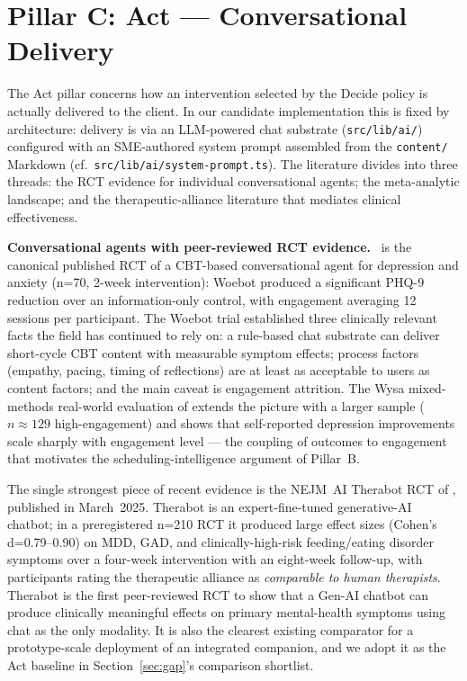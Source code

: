 \documentclass[10pt,conference]{article}
\newcommand{\secref}[1]{Section~\ref{#1}}
\renewcommand{\paragraph}[1]{\smallskip\par\noindent\textbf{#1}~\ignorespaces}
\begin{document}
\section{Pillar C: Act --- Conversational Delivery}\label{sec:act}

The Act pillar concerns how an intervention selected by the Decide
policy is actually delivered to the client. In our candidate
implementation this is fixed by architecture: delivery is via an
LLM-powered chat substrate (\texttt{src/lib/ai/}) configured with an
SME-authored system prompt assembled from the \texttt{content/}
Markdown (cf.\ \texttt{src/lib/ai/system-prompt.ts}). The literature
divides into three threads: the RCT evidence for individual
conversational agents; the meta-analytic landscape; and the
therapeutic-alliance literature that mediates clinical effectiveness.

\paragraph{Conversational agents with peer-reviewed RCT evidence.}
\cite{Fitzpatrick2017Woebot} is the canonical published RCT of a
CBT-based conversational agent for depression and anxiety (n=70,
2-week intervention): Woebot produced a significant PHQ-9 reduction
over an information-only control, with engagement averaging 12
sessions per participant. The Woebot trial established three
clinically relevant facts the field has continued to rely on: a
rule-based chat substrate can deliver short-cycle CBT content with
measurable symptom effects; process factors (empathy, pacing, timing
of reflections) are at least as acceptable to users as content
factors; and the main caveat is engagement attrition. The Wysa
mixed-methods real-world evaluation of \cite{Inkster2018Wysa} extends
the picture with a larger sample ($n\!\approx\!129$ high-engagement)
and shows that self-reported depression improvements scale sharply
with engagement level --- the coupling of outcomes to engagement that
motivates the scheduling-intelligence argument of Pillar~B.

The single strongest piece of recent evidence is the NEJM~AI
Therabot RCT of \cite{Heinz2025TherabotRCT}, published in March~2025.
Therabot is an expert-fine-tuned generative-AI chatbot; in a
preregistered n=210 RCT it produced large effect sizes (Cohen's
d=0.79--0.90) on MDD, GAD, and clinically-high-risk feeding/eating
disorder symptoms over a four-week intervention with an eight-week
follow-up, with participants rating the therapeutic alliance as
\emph{comparable to human therapists}. Therabot is the first
peer-reviewed RCT to show that a Gen-AI chatbot can produce
clinically meaningful effects on primary mental-health symptoms
using chat as the only modality. It is also the clearest existing
comparator for a prototype-scale deployment of an integrated
companion, and we adopt it as the Act baseline in \secref{sec:gap}'s
comparison shortlist.
\end{document}

